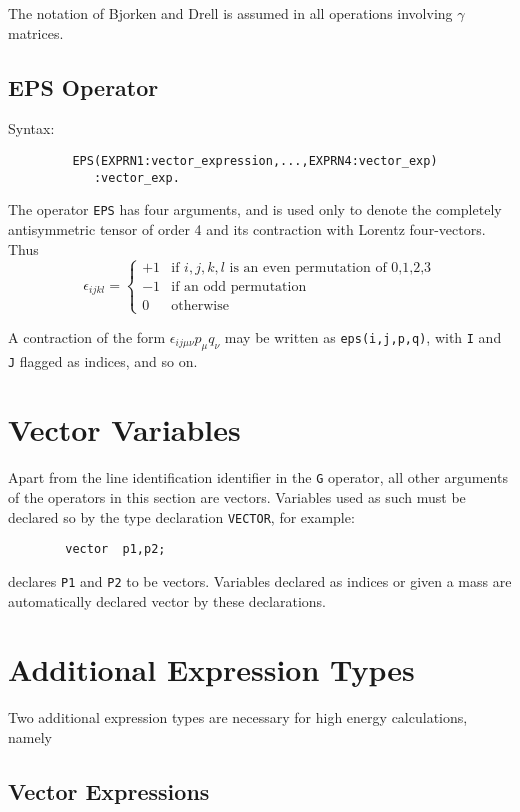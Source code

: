 The notation of Bjorken and Drell is assumed in all operations involving
$\gamma$ matrices.

\subsection{EPS Operator}
Syntax:
\begin{verbatim}
         EPS(EXPRN1:vector_expression,...,EXPRN4:vector_exp)
            :vector_exp.
\end{verbatim}
The operator {\tt EPS} has four arguments, and is used only to denote the
completely antisymmetric tensor of order 4 and its contraction with Lorentz
four-vectors. Thus
\[ \epsilon_{i j k l} = \left\{ \begin{array}{cl}
				+1 & \mbox{if $i,j,k,l$ is an even permutation
					      of 0,1,2,3} \\
				-1 & \mbox{if an odd permutation} \\
				0 & \mbox{otherwise}
			      \end{array}
		      \right. \]

A contraction of the form $\epsilon_{i j \mu \nu}p_{\mu}q_{\nu}$ may be
written as {\tt eps(i,j,p,q)}, with {\tt I} and {\tt J} flagged as indices,
and so on.

\section{Vector Variables}

Apart from the line identification identifier in the {\tt G} operator, all
other arguments of the operators in this section are vectors.  Variables
used as such must be declared so by the type declaration {\tt VECTOR},
 for example:
\begin{verbatim}
        vector  p1,p2;
\end{verbatim}
declares {\tt P1} and {\tt P2} to be vectors.  Variables declared as
indices or given a mass are automatically declared
vector by these declarations.

\section{Additional Expression Types}

Two additional expression types are necessary for high energy
calculations, namely

\subsection{Vector Expressions}

